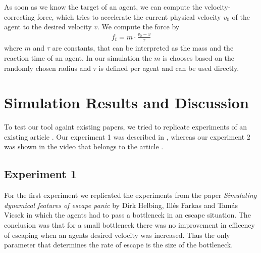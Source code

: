 \documentclass[11pt]{article}
\begin{document}
\begin{itemize}
	As soon as we know the target of an agent, we can compute the velocity-correcting force, which tries to accelerate the current physical velocity $v_0$ of the agent to the desired velocity $v$. We compute the force by    
	\begin{align*}
	  f_t = m \cdot \frac{v_0-v}{\tau}
	\end{align*}
	where $m$ and $\tau$ are constants, that can be interpreted as the mass and the reaction time of an agent. In our simulation the $m$ is chooses based on the randomly chosen radius and $\tau$ is defined per agent and can be used directly.
    
\end{itemize}

\section{Simulation Results and Discussion}
To test our tool againt existing papers, we tried to replicate experiments of an existing article \cite{Helbing}. Our experiment 1 was described in \cite{Helbing}, whereas our experiment 2 was shown in the video that belongs to the article \cite{Helbing}.  


\subsection{Experiment 1}

For the first experiment we replicated the experiments from the paper \textit{Simulating dynamical features of escape panic} by Dirk Helbing, Illés Farkas and Tamás Vicsek in which the agents had to pass a bottleneck in an escape situation. The conclusion was that for a small bottleneck there was no improvement in efficency of escaping when an agents desired velocity was increased. Thus the only parameter that determines the rate of escape is the size of the bottleneck.
\end{document}
